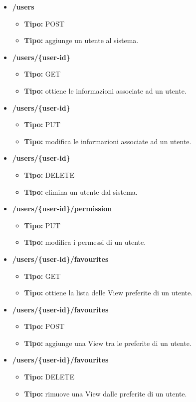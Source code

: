 \begin{itemize}

  \item \textbf{/users}
  \begin{itemize}
    \item \textbf{Tipo:} POST
    \item \textbf{Tipo:} aggiunge un utente al sistema.
  \end{itemize}
  \item \textbf{/users/\{user-id\}}
  \begin{itemize}
    \item \textbf{Tipo:} GET
    \item \textbf{Tipo:} ottiene le informazioni associate ad un utente.
  \end{itemize}
  \item \textbf{/users/\{user-id\}}
  \begin{itemize}
    \item \textbf{Tipo:} PUT
    \item \textbf{Tipo:} modifica le informazioni associate ad un utente.
  \end{itemize}
  \item \textbf{/users/\{user-id\}}
  \begin{itemize}
    \item \textbf{Tipo:} DELETE
    \item \textbf{Tipo:} elimina un utente dal sistema.
  \end{itemize}
  \item \textbf{/users/\{user-id\}/permission}
  \begin{itemize}
    \item \textbf{Tipo:} PUT
    \item \textbf{Tipo:} modifica i permessi di un utente.
  \end{itemize}
  \item \textbf{/users/\{user-id\}/favourites}
  \begin{itemize}
    \item \textbf{Tipo:} GET
    \item \textbf{Tipo:} ottiene la lista delle View preferite di un utente.
  \end{itemize}
  \item \textbf{/users/\{user-id\}/favourites}
  \begin{itemize}
    \item \textbf{Tipo:} POST
    \item \textbf{Tipo:} aggiunge una View tra le preferite di un utente.
  \end{itemize}
  \item \textbf{/users/\{user-id\}/favourites}
  \begin{itemize}
    \item \textbf{Tipo:} DELETE
    \item \textbf{Tipo:} rimuove una View dalle preferite di un utente.
  \end{itemize}


\end{itemize}
